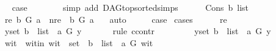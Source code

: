 \begin{isabellebody}
\ \isamarkupfalse%
\ {\isacharquery}{\kern0pt}case\ \ \isanewline
\ \ \ \ \isamarkupfalse%
\ {\isacharparenleft}{\kern0pt}simp\ add{\isacharcolon}{\kern0pt}\ DAG{\isachardot}{\kern0pt}top{\isacharunderscore}{\kern0pt}sorted{\isachardot}{\kern0pt}simps{\isacharparenright}{\kern0pt}\ \ \isanewline
{}\isamarkupfalse%
\isanewline
\ \ \isamarkupfalse%
\ {\isacharparenleft}{\kern0pt}Cons\ b\ list{\isacharparenright}{\kern0pt}\isanewline
\ \ \isamarkupfalse%
\ {\isacharparenleft}{\kern0pt}re{\isacharparenright}{\kern0pt}\ {\isachardoublequoteopen}b\ {\isasymrightarrow}\isactrlsup {\isacharplus}{\kern0pt}\isactrlbsub G\isactrlesub \ a{\isachardoublequoteclose}\ {\isacharbar}{\kern0pt}\ {\isacharparenleft}{\kern0pt}nre{\isacharparenright}{\kern0pt}\ {\isachardoublequoteopen}{\isasymnot}\ b\ {\isasymrightarrow}\isactrlsup {\isacharplus}{\kern0pt}\isactrlbsub G\isactrlesub \ a\ {\isachardoublequoteclose}\ \isamarkupfalse%
\ auto\isanewline
\ \ \isamarkupfalse%
\ \isamarkupfalse%
\ {\isacharquery}{\kern0pt}case\ \isamarkupfalse%
{\isacharparenleft}{\kern0pt}cases{\isacharparenright}{\kern0pt}\isanewline
\ \ \ \ \isamarkupfalse%
\ re\isanewline
\ \ \ \ \isamarkupfalse%
\ {\isachardoublequoteopen}{\isacharparenleft}{\kern0pt}{\isasymforall}y{\isasymin}set\ {\isacharparenleft}{\kern0pt}b\ {\isacharhash}{\kern0pt}\ list{\isacharparenright}{\kern0pt}{\isachardot}{\kern0pt}\ {\isasymnot}\ a\ {\isasymrightarrow}\isactrlsup {\isacharplus}{\kern0pt}\isactrlbsub G\isactrlesub \ y\ {\isacharparenright}{\kern0pt}{\isachardoublequoteclose}\ \isanewline
\ \ \ \ \isamarkupfalse%
{\isacharparenleft}{\kern0pt}rule\ ccontr{\isacharparenright}{\kern0pt}\isanewline
\ \ \ \ \ \ \isamarkupfalse%
\ {\isachardoublequoteopen}{\isasymnot}\ {\isacharparenleft}{\kern0pt}{\isasymforall}y{\isasymin}set\ {\isacharparenleft}{\kern0pt}b\ {\isacharhash}{\kern0pt}\ list{\isacharparenright}{\kern0pt}{\isachardot}{\kern0pt}\ {\isasymnot}\ a\ {\isasymrightarrow}\isactrlsup {\isacharplus}{\kern0pt}\isactrlbsub G\isactrlesub \ y{\isacharparenright}{\kern0pt}{\isachardoublequoteclose}\isanewline
\ \ \ \ \ \ \isamarkupfalse%
\ \isamarkupfalse%
\ wit\ \ wit{\isacharunderscore}{\kern0pt}in{\isacharcolon}{\kern0pt}\ {\isachardoublequoteopen}wit\ {\isasymin}\ set\ \ {\isacharparenleft}{\kern0pt}b\ {\isacharhash}{\kern0pt}\ list{\isacharparenright}{\kern0pt}\ {\isasymand}\ a\ {\isasymrightarrow}\isactrlsup {\isacharplus}{\kern0pt}\isactrlbsub G\isactrlesub \ wit{\isachardoublequoteclose}\ \isamarkupfalse%

\end{isabellebody}
